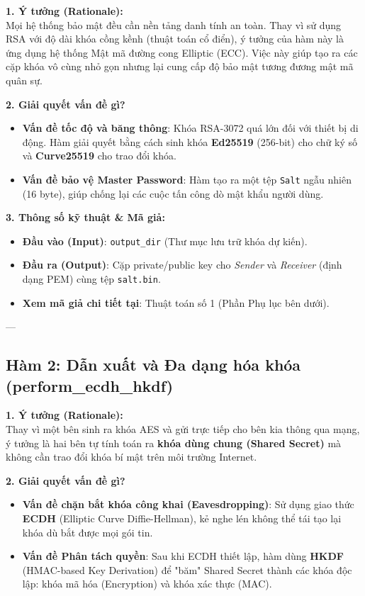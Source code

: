 \documentclass[11pt,a4paper]{article}
\begin{document}
\textbf{1. Ý tưởng (Rationale):} \\
Mọi hệ thống bảo mật đều cần nền tảng danh tính an toàn. Thay vì sử dụng RSA với độ dài khóa cồng kềnh (thuật toán cổ điển), ý tưởng của hàm này là ứng dụng hệ thống Mật mã đường cong Elliptic (ECC). Việc này giúp tạo ra các cặp khóa vô cùng nhỏ gọn nhưng lại cung cấp độ bảo mật tương đương mật mã quân sự. 

\textbf{2. Giải quyết vấn đề gì?}
\begin{itemize}[noitemsep]
    \item \textbf{Vấn đề tốc độ và băng thông}: Khóa RSA-3072 quá lớn đối với thiết bị di động. Hàm giải quyết bằng cách sinh khóa \textbf{Ed25519} (256-bit) cho chữ ký số và \textbf{Curve25519} cho trao đổi khóa.
    \item \textbf{Vấn đề bảo vệ Master Password}: Hàm tạo ra một tệp \texttt{Salt} ngẫu nhiên (16 byte), giúp chống lại các cuộc tấn công dò mật khẩu người dùng.
\end{itemize}

\textbf{3. Thông số kỹ thuật \& Mã giả:}
\begin{itemize}[noitemsep]
    \item \textbf{Đầu vào (Input)}: \texttt{output\_dir} (Thư mục lưu trữ khóa dự kiến).
    \item \textbf{Đầu ra (Output)}: Cặp private/public key cho \textit{Sender} và \textit{Receiver} (định dạng PEM) cùng tệp \texttt{salt.bin}.
    \item \textbf{Xem mã giả chi tiết tại}: Thuật toán số 1 (Phần Phụ lục bên dưới).
\end{itemize}

---

\subsection{Hàm 2: Dẫn xuất và Đa dạng hóa khóa (perform\_ecdh\_hkdf)}

\textbf{1. Ý tưởng (Rationale):} \\
Thay vì một bên sinh ra khóa AES và gửi trực tiếp cho bên kia thông qua mạng, ý tưởng là hai bên tự tính toán ra \textbf{khóa dùng chung (Shared Secret)} mà không cần trao đổi khóa bí mật trên môi trường Internet.

\textbf{2. Giải quyết vấn đề gì?}
\begin{itemize}[noitemsep]
    \item \textbf{Vấn đề chặn bắt khóa công khai (Eavesdropping)}: Sử dụng giao thức \textbf{ECDH} (Elliptic Curve Diffie-Hellman), kẻ nghe lén không thể tái tạo lại khóa dù bắt được mọi gói tin.
    \item \textbf{Vấn đề Phân tách quyền}: Sau khi ECDH thiết lập, hàm dùng \textbf{HKDF} (HMAC-based Key Derivation) để "băm" Shared Secret thành các khóa độc lập: khóa mã hóa (Encryption) và khóa xác thực (MAC).
\end{itemize}
\end{document}
